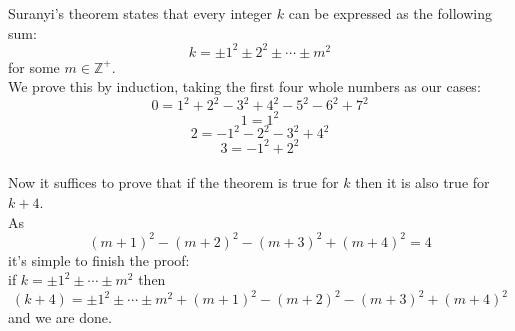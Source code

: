 \documentclass[12pt]{article}
\begin{document}
Suranyi's theorem states that every integer $k$ can be expressed as the following sum:
$$ k=\pm 1^2 \pm 2^2 \pm \cdots \pm m^2 $$ 
for some $m \in \mathbb{Z}^+$.\\
We prove this by induction, taking the first four whole numbers as our  cases:
$$ 0 = 1^2 + 2^2 - 3^2 + 4^2 - 5^2 - 6^2 + 7^2 $$
$$ 1 = 1^2 $$
$$ 2 = -1^2 - 2^2 - 3^2 + 4^2 $$
$$ 3 = -1^2 + 2^2$$
\\Now it suffices to prove that if the theorem is true for $k$ then
it is also true for $k+4$.
\\As
$$ (m+1)^2 - (m+2)^2 - (m+3)^2 + (m+4)^2 = 4 $$
it's simple to finish the proof:
\\if $ k=\pm 1^2 \pm \cdots \pm m^2 $ then
$$ (k+4)=\pm 1^2 \pm \cdots \pm m^2 + (m+1)^2 - (m+2)^2 - (m+3)^2 + (m+4)^2$$
and we are done.
\end{document}
